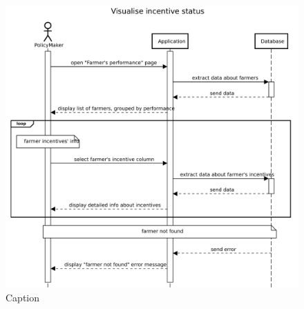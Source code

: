 \begin{figure}[H]
    \centering
    \includegraphics[scale=0.5]{Images/Sequence diagrams/PolicyMaker - visualise incentive status.pdf}
    \caption{Caption}
    \label{fig:my_label}
\end{figure}

